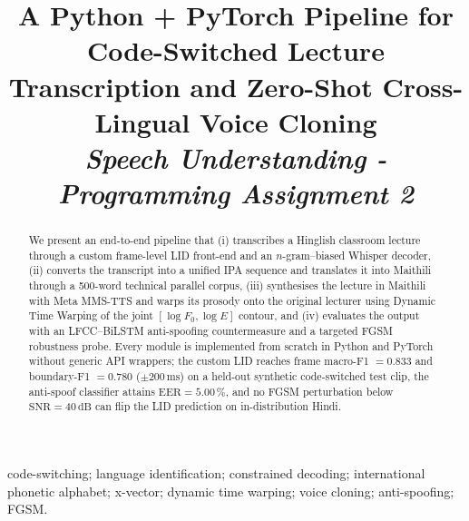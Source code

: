 \documentclass[conference]{IEEEtran}
\begin{document}
\title{A Python + PyTorch Pipeline for Code-Switched Lecture
  Transcription and Zero-Shot Cross-Lingual Voice Cloning\\
  \large{\textit{Speech Understanding - Programming Assignment 2}}}

\author{
}

\maketitle

\begin{abstract}
We present an end-to-end pipeline that (i) transcribes a Hinglish
classroom lecture through a custom frame-level LID front-end and an
\mbox{$n$-gram--biased} Whisper decoder, (ii) converts the transcript
into a unified IPA sequence and translates it into Maithili through a
500-word technical parallel corpus, (iii) synthesises the lecture in
Maithili with Meta MMS-TTS and warps its prosody onto the original
lecturer using Dynamic Time Warping of the joint $[\log F_0,\log E]$
contour, and (iv) evaluates the output with an LFCC--BiLSTM
anti-spoofing countermeasure and a targeted FGSM robustness probe.
Every module is implemented from scratch in Python and PyTorch
without generic API wrappers; the custom LID reaches frame macro-F1
$=0.833$ and boundary-F1 $=0.780$ ($\pm 200\,\mathrm{ms}$) on a
held-out synthetic code-switched test clip, the anti-spoof classifier
attains $\mathrm{EER}=5.00\,\%$, and no FGSM perturbation below
$\mathrm{SNR}=40\,\mathrm{dB}$ can flip the LID prediction on
in-distribution Hindi.
\end{abstract}

\begin{IEEEkeywords}
code-switching; language identification; constrained decoding;
international phonetic alphabet; x-vector; dynamic time warping;
voice cloning; anti-spoofing; FGSM.
\end{IEEEkeywords}

\end{document}
